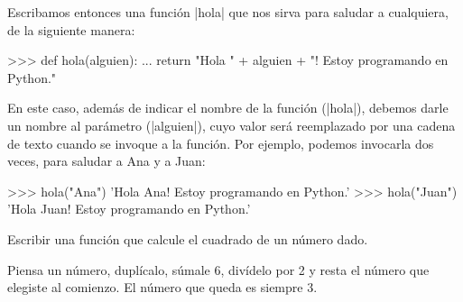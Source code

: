 Escribamos entonces una función |hola| que nos sirva para saludar a
cualquiera, de la siguiente manera:

\begin{codigo-python-sn}
>>> def hola(alguien):
...     return "Hola " + alguien + "! Estoy programando en Python."
\end{codigo-python-sn}

En este caso, además de indicar el nombre de la función (|hola|), debemos darle
un nombre al parámetro (|alguien|), cuyo valor será reemplazado por una cadena
de texto cuando se invoque a la función. Por ejemplo, podemos invocarla dos
veces, para saludar a Ana y a Juan:

\begin{codigo-python-sn}
>>> hola("Ana")
'Hola Ana! Estoy programando en Python.'
>>> hola("Juan")
'Hola Juan! Estoy programando en Python.'
\end{codigo-python-sn}

\begin{problema}
\label{cuadrado}
Escribir una función que calcule el cuadrado de un número dado.
\end{problema}


\begin{problema}
Piensa un número, duplícalo, súmale 6, divídelo por 2 y resta el número
que elegiste al comienzo. El número que queda es siempre 3.
\end{problema}

